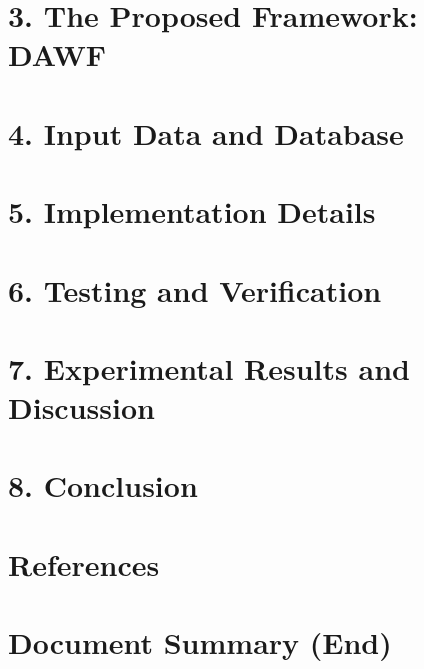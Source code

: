 \documentclass{article}
\begin{document}
\section*{3. The Proposed Framework: DAWF}


\section*{4. Input Data and Database}


\section*{5. Implementation Details}


\section*{6. Testing and Verification}


\section*{7. Experimental Results and Discussion}


\section*{8. Conclusion}


\section*{References}

\section*{Document Summary (End)}
\end{document}
